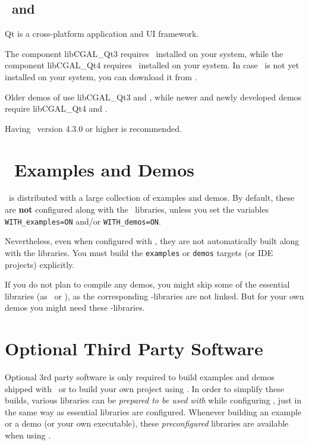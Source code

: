 \subsection{\ and \label{thirdparty:Qt3}\label{thirdparty:Qt4}\label{thirdparty:Qt}}

Qt is a cross-platform application and UI framework.

The component libCGAL\_Qt3 requires \ installed on your system, while
the component libCGAL\_Qt4 requires \ installed on your system. 
In case \qt\ is not yet installed on your system, you can download 
it from \qtpage. 

Older demos of \cgal use libCGAL\_Qt3 and , while newer and newly
developed demos require libCGAL\_Qt4 and . 

Having \ version 4.3.0 or higher is recommended.

\section{\cgal\ Examples and Demos}

\cgal\ is distributed with a large collection of examples and demos. By default, these are \textbf{not} configured along with
the \cgal\ libraries, unless you set the variables \texttt{WITH\_examples=ON} and/or \texttt{WITH\_demos=ON}.

Nevertheless, even when configured with \cgal, they are not automatically built along with the libraries.
You must build the \texttt{examples} or \texttt{demos} targets (or IDE projects) explicitly.

If you do not plan to compile any demos, you might skip some of the essential libraries (as \qt\ or
\opengl), as the corresponding \cgal-libraries are not linked. But for
your own demos you might need these \cgal-libraries.

\section{Optional Third Party Software\label{sec:optional3rdpartysoftware}}

Optional 3rd party software is only required to build examples and
demos shipped with \cgal\ or to build your own project using \cgal. In order
to simplify these builds, various libraries can be \emph{prepared to be
used with \cgal} while configuring \cgal, just in the same way as
essential libraries are configured. Whenever building an example or a
demo (or your own executable), these \emph{preconfigured} libraries
are available when using \cgal. 

